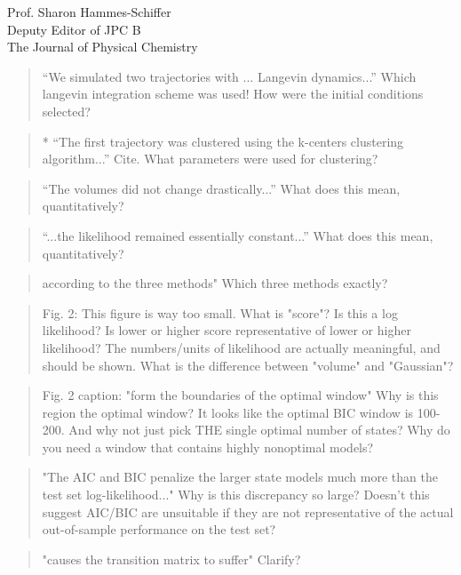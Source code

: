 \documentclass{letter}
\begin{document}
\begin{letter}{Prof. Sharon Hammes-Schiffer \\ Deputy Editor of JPC B \\ The Journal of Physical Chemistry}
\begin{quote}
``We simulated two trajectories with ... Langevin dynamics...''  Which langevin integration scheme was used!  How were the initial conditions selected?
\end{quote}

\begin{quote}
* ``The first trajectory was clustered using the k-centers clustering algorithm...'' Cite.  What parameters were used for clustering?
\end{quote}

\begin{quote}
``The volumes did not change drastically...'' What does this mean, quantitatively?
\end{quote}

\begin{quote}
``...the likelihood remained essentially constant...'' What does this mean, quantitatively?
\end{quote}

\begin{quote}
according to the three methods" Which three methods exactly?
\end{quote}

\begin{quote}
Fig. 2: This figure is way too small.  What is "score"?  Is this a log likelihood?  Is lower or higher score representative of lower or higher likelihood?  The numbers/units of likelihood are actually meaningful, and should be shown.  What is the difference between "volume" and "Gaussian"?
\end{quote}

\begin{quote}
Fig. 2 caption: "form the boundaries of the optimal window"  Why is this region the optimal window?  It looks like the optimal BIC window is 100-200.  And why not just pick THE single optimal number of states?  Why do you need a window that contains highly nonoptimal models?
\end{quote}

\begin{quote}
"The AIC and BIC penalize the larger state models much more than the test set log-likelihood..."  Why is this discrepancy so large?  Doesn't this suggest AIC/BIC are unsuitable if they are not representative of the actual out-of-sample performance on the test set?
\end{quote}

\begin{quote}
"causes the transition matrix to suffer"  Clarify?
\end{quote}


\end{letter}
\end{document}
